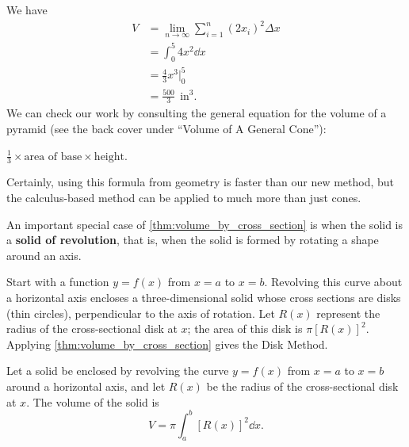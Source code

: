 \begin{example}
We have 
\begin{align*}
	V
	&= \lim_{n\to\infty} \sum_{i=1}^n (2x_i)^2\Delta x\\
	&= \int_0^5 4x^2\dd x\\
	&= \frac43x^3\Big|_0^5 \\
	&=\frac{500}{3}\ %
	\ \text{in}^3.
\end{align*}
We can check our work by consulting the general equation for the volume of a pyramid (see the back cover under ``Volume of A General Cone''): 
\begin{center}
$\frac13\times \text{area of base}\times \text{height}$.
\end{center}
Certainly, using this formula from geometry is faster than our new method, but the calculus-based method can be applied to much more than just cones.
\end{example}

An important special case of \autoref{thm:volume_by_cross_section} is when the solid is a \textbf{solid of revolution}, that is, when the solid is formed by rotating a shape around an axis.

Start with a function $y=f(x)$ from $x=a$ to $x=b$. Revolving this curve about a horizontal axis encloses a three-dimensional solid whose cross sections are disks (thin circles), perpendicular to the axis of rotation. Let $R(x)$ represent the radius of the cross-sectional disk at $x$; the area of this disk is $\pi [R(x)]^2$. Applying \autoref{thm:volume_by_cross_section} gives the Disk Method.

\begin{keyidea}\label{idea:disk_method}
Let a solid be enclosed by revolving the curve $y=f(x)$ from $x=a$ to $x=b$ around a horizontal axis, and let $R(x)$ be the radius of the cross-sectional disk at $x$. The volume of the solid is
\[V = \pi \int_a^b [R(x)]^2\dd x.\]
\end{keyidea}


